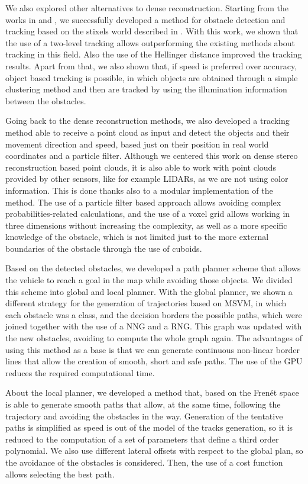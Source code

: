 We also explored other alternatives to dense reconstruction. Starting from the works in \cite{benenson2011stixels} and \cite{gunyel2012stixels}, we successfully developed a method for obstacle detection and tracking based on the stixels world described in \cite{badino2009stixel}. With this work, we shown that the use of a two-level tracking allows outperforming the existing methods about tracking in this field. Also the use of the Hellinger distance improved the tracking results. Apart from that, we also shown that, if speed is preferred over accuracy, object based tracking is possible, in which objects are obtained through a simple clustering method and then are tracked by using the illumination information between the obstacles.

Going back to the dense reconstruction methods, we also developed a tracking method able to receive a point cloud as input and detect the objects and their movement direction and speed, based just on their position in real world coordinates and a particle filter. Although we centered this work on dense stereo reconstruction based point clouds, it is also able to work with point clouds provided by other sensors, like for example \acp{LIDAR}, as we are not using color information. This is done thanks also to a modular implementation of the method. The use of a particle filter based approach allows avoiding complex probabilities-related calculations, and the use of a voxel grid allows working in three dimensions without increasing the complexity, as well as a more specific knowledge of the obstacle, which is not limited just to the more external boundaries of the obstacle through the use of cuboids.

Based on the detected obstacles, we developed a path planner scheme that allows the vehicle to reach a goal in the map while avoiding those objects. We divided this scheme into global and local planner. With the global planner, we shown a different strategy for the generation of trajectories based on \ac{MSVM}, in which each obstacle was a class, and the decision borders the possible paths, which were joined together with the use of a \acl{NNG} and a \acl{RNG}. This graph was updated with the new obstacles, avoiding to compute the whole graph again. The advantages of using this method as a base is that we can generate continuous non-linear border lines that allow the creation of smooth, short and safe paths. The use of the \ac{GPU} reduces the required computational time. 

About the local planner, we developed a method that, based on the Frenét space is able to generate smooth paths that allow, at the same time, following the trajectory and avoiding the obstacles in the way. Generation of the tentative paths is simplified as speed is out of the model of the tracks generation, so it is reduced to the computation of a set of parameters that define a third order polynomial. We also use different lateral offsets with respect to the global plan, so the avoidance of the obstacles is considered. Then, the use of a cost function allows selecting the best path.

